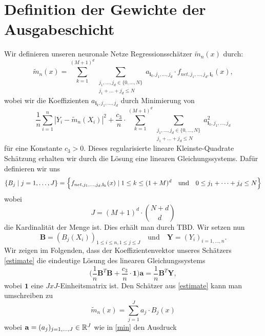 \section{Definition der Gewichte der Ausgabeschicht}

Wir definieren unseren neuronale Netze Regressionsschätzer $\tilde{m}_n(x)$ durch$\colon$
\begin{equation}
\label{estimate}
\tilde{m}_n(x) = \sum_{k = 1}^{(M + 1)^d} \sum_{\substack{ j_1,\dots,j_d \in \{0,\dots,N\} \\j_1+\dots +j_d \leq N}} a_{\mathbf{i}_k,j_1,\dots,j_d} \cdot f_{net,j_1,\dots,j_d,\mathbf{i}_k}(x),
\end{equation}
wobei wir die Koeffizienten $a_{\mathbf{i}_k,j_1,\dots,j_d}$ durch Minimierung von 
\begin{equation}
\label{min} \frac{1}{n} \sum_{i = 1}^n|Y_i - \tilde{m}_n(X_i)|^2 + \frac{c_3}{n} \cdot \sum_{k = 1}^{(M + 1)^d} \sum_{\substack{ j_1,\dots,j_d \in \{0,\dots,N\} \\j_1+\dots +j_d \leq N}} a_{\mathbf{i}_k,j_1,\dots,j_d}^2
\end{equation}
für eine Konstante $c_3 > 0.$ Dieses regularisierte lineare Kleinste-Quadrate Schätzung erhalten wir durch die Lösung eine linearen Gleichungssystems. Dafür definieren wir uns 
\begin{align*} 
\{B_j \mid j = 1,\dots,J\} = \Bigl\{f_{net,j_1,\dots,j_d,\mathbf{i}_k}(x) \mid 1\leq k \leq (1 + M)^d \quad \text{und} \quad 0 \leq j_1 + \cdots + j_d \leq N \Bigr\}
\end{align*}
wobei
$$ J = (M + 1)^d \cdot \binom{N + d}{d}$$ die Kardinalität der Menge ist.
Dies erhält man durch TBD.
Wir setzen nun 
$$ \mathbf{B} = (B_j(X_i))_{1\leq i \leq n,1\leq j \leq J} \quad \text{und} \quad \mathbf{Y} = (Y_i)_{i = 1,\dots,n}.$$
Wir zeigen im Folgenden, dass der Koeffizientenvektor unseres Schätzers \ref{estimate} die eindeutige Lösung des linearen Gleichungssystems 
\begin{equation}
\label{les}
\bigg(\frac{1}{n}\mathbf{B}^T\mathbf{B} + \frac{c_3}{n} \cdot \mathbf{1} \bigg) \mathbf{a} = \frac{1}{n} \mathbf{B}^T\mathbf{Y},
\end{equation}
wobei $\mathbf{1}$ eine $JxJ$-Einheitsmatrix ist.
Den Schätzer aus \ref{estimate} kann man umschreiben zu 
$$ \tilde{m}_n(x) = \sum_{j = 1}^J a_j \cdot B_j(x)$$
wobei $\mathbf{a} = (a_j)_{j = 1,\dots,J} \in \mathbb{R}^J$ wie in \ref{min} den Ausdruck
